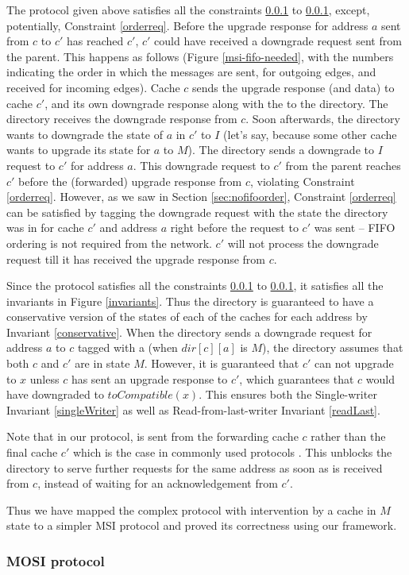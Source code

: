 The protocol given above satisfies all the constraints \ref{} to \ref{}, except,
potentially, Constraint \ref{orderreq}. Before the upgrade response for address
$a$ sent from $c$ to $c'$ has reached $c'$, $c'$ could have received a downgrade
request sent from the parent. This happens as follows (Figure
\ref{msi-fifo-needed}, with the numbers indicating the order in which the
messages are sent, for outgoing edges, and received for incoming edges). Cache
$c$ sends the upgrade response (and data) to cache $c'$, and its own downgrade
response along with the \FwdAck{} to the directory. The directory receives the
downgrade response from $c$. Soon afterwards, the directory wants to downgrade
the state of $a$ in $c'$ to $I$ (let's say, because some other cache wants to
upgrade its state for $a$ to $M$).  The directory sends a downgrade to $I$
request to $c'$ for address $a$. This downgrade request to $c'$ from the parent
reaches $c'$ before the (forwarded) upgrade response from $c$, violating
Constraint \ref{orderreq}. However, as we saw in Section \ref{sec:nofifoorder},
Constraint \ref{orderreq} can be satisfied by tagging the downgrade request with
the state the directory was in for cache $c'$ and address $a$ right before the
request to $c'$ was sent -- FIFO ordering is not required from the network. $c'$
will not process the downgrade request till it has received the upgrade response
from $c$.

Since the protocol satisfies all the constraints \ref{} to \ref{}, it satisfies
all the invariants in Figure \ref{invariants}. Thus the directory is guaranteed
to have a conservative version of the states of each of the caches for each
address by Invariant \ref{conservative}. When the directory sends a downgrade
request for address $a$ to $c$ tagged with a  (when $dir[c][a]$ is
$M$), the directory assumes that both $c$ and $c'$ are in state $M$. However, it
is guaranteed that $c'$ can not upgrade to $x$ unless $c$ has sent an upgrade
response to $c'$, which guarantees that $c$ would have downgraded to
$toCompatible(x)$. This ensures both the Single-writer Invariant
\ref{singleWriter} as well as Read-from-last-writer Invariant \ref{readLast}.

Note that in our protocol, \FwdAck is sent from the forwarding cache $c$ rather
than the final cache $c'$ which is the case in commonly used protocols
\cite{hammer, gems}. This unblocks the directory to serve further requests for
the same address as soon as \FwdAck is received from $c$, instead of waiting for
an acknowledgement from $c'$.

Thus we have mapped the complex protocol with intervention by a cache in $M$
state to a simpler MSI protocol and proved its correctness using our framework.

\subsubsection{MOSI protocol}
